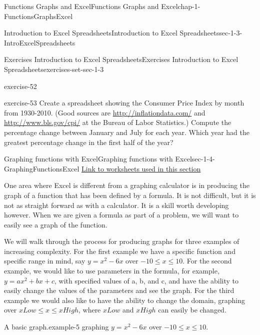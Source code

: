 \documentclass[oneside,10pt,]{book}
\numberwithin{equation}{section}
\begin{document}
\begin{chapterptx}{Functions Graphs and Excel}{}{Functions Graphs and Excel}{}{}{chap-1-FunctionsGraphsExcel}
\begin{sectionptx}{Introduction to Excel Spreadsheets}{}{Introduction to Excel Spreadsheets}{}{}{sec-1-3-IntroExcelSpreadsheets}
\begin{exercises-subsection-numberless}{Exercises Introduction to Excel Spreadsheets}{}{Exercises Introduction to Excel Spreadsheets}{}{}{exercises-set-sec-1-3}
\begin{divisionexercise}{10}{}{}{exercise-52}
\end{divisionexercise}%
\begin{divisionexercise}{11}{}{}{exercise-53}%
\hypertarget{p-312}{}%
Create a spreadsheet showing the Consumer Price Index by month from 1930-2010.  (Good sources are \href{http://inflationdata.com/}{http:\slash{}\slash{}inflationdata.com\slash{}} and \href{http://www.bls.gov/cpi/}{http:\slash{}\slash{}www.bls.gov\slash{}cpi\slash{}} at the Bureau of Labor Statistics.)  Compute the percentage change between January and July for each year.  Which year had the greatest percentage change in the first half of the year?%
\end{divisionexercise}%
\end{exercises-subsection-numberless}
\end{sectionptx}
%
%
\typeout{************************************************}
\typeout{************************************************}
%
\begin{sectionptx}{Graphing functions with Excel}{}{Graphing functions with Excel}{}{}{sec-1-4-GraphingFunctionsExcel}
\hypertarget{p-313}{}%
\href{./Examples/Section-1-4-Examples.xlsx}{Link to worksheets used in this section}%
\par
\hypertarget{p-314}{}%
One area where Excel is different from a graphing calculator is in producing the graph of a function that has been defined by a formula.  It is not difficult, but it is not as straight forward as with a calculator. It is a skill worth developing however.  When we are given a formula as part of a problem, we will want to easily see a graph of the function.%
\par
\hypertarget{p-315}{}%
We will walk through the process for producing graphs for three examples of increasing complexity.  For the first example we have a specific function and specific range in mind, say \(y=x^2-6 x\) over \(-10 \le x \le 10\).  For the second example, we would like to use parameters in the formula, for example, \(y = a x^2 + b x + c\), with specified values of a, b, and c, and have the ability to easily change the values of the parameters and see the graph.  For the third example we would also like to have the ability to change the domain, graphing over \(xLow \le x \le xHigh\), where \(xLow\) and \(xHigh\) can easily be changed.%
\begin{example}{A basic graph.}{example-5}%
\hypertarget{p-316}{}%
graphing \(y=x^2-6 x\) over \(-10 \le x \le 10\).%
\begin{sidebyside}{1}{0.1}{0.1}{0}%

\end{sidebyside}
\end{example}
\end{sectionptx}
\end{chapterptx}
\end{document}

